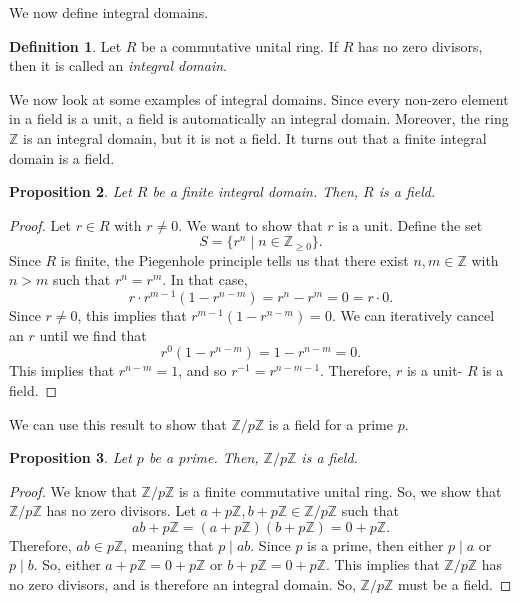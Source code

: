 \documentclass[a4paper, openany]{memoir}
\theoremstyle{definition}
\newtheorem{definition}{Definition}[section]
\theoremstyle{plain}
\newtheorem{proposition}[definition]{Proposition}
\begin{document}
We now define integral domains.
\begin{definition}
Let $R$ be a commutative unital ring. If $R$ has no zero divisors, then it is called an \emph{integral domain}.
\end{definition}
\noindent We now look at some examples of integral domains. Since every non-zero element in a field is a unit, a field is automatically an integral domain. Moreover, the ring $\mathbb{Z}$ is an integral domain, but it is not a field. It turns out that a finite integral domain is a field.
\begin{proposition}
Let $R$ be a finite integral domain. Then, $R$ is a field.
\end{proposition}
\begin{proof}
Let $r \in R$ with $r \neq 0$. We want to show that $r$ is a unit. Define the set
\[S = \{r^n \mid n \in \mathbb{Z}_{\geqslant 0}\}.\]
Since $R$ is finite, the Piegenhole principle tells us that there exist $n, m \in \mathbb{Z}$ with $n > m$ such that $r^n = r^m$. In that case,
\[r \cdot r^{m-1} (1 - r^{n-m}) = r^n - r^m = 0 = r \cdot 0.\]
Since $r \neq 0$, this implies that $r^{m-1}(1 - r^{n-m}) = 0$. We can iteratively cancel an $r$ until we find that 
\[r^0(1 - r^{n-m}) = 1 - r^{n-m} = 0.\]
This implies that $r^{n-m} = 1$, and so $r^{-1} = r^{n-m-1}$. Therefore, $r$ is a unit- $R$ is a field.
\end{proof}
\noindent We can use this result to show that $\mathbb{Z}/p \mathbb{Z}$ is a field for a prime $p$.
\begin{proposition}
Let $p$ be a prime. Then, $\mathbb{Z}/p \mathbb{Z}$ is a field.
\end{proposition}
\begin{proof}
We know that $\mathbb{Z}/p \mathbb{Z}$ is a finite commutative unital ring. So, we show that $\mathbb{Z}/p \mathbb{Z}$ has no zero divisors. Let $a + p \mathbb{Z}, b + p \mathbb{Z} \in \mathbb{Z}/p \mathbb{Z}$ such that 
\[ab + p \mathbb{Z} = (a + p \mathbb{Z})(b + p \mathbb{Z}) = 0 + p \mathbb{Z}.\]
Therefore, $ab \in p\mathbb{Z}$, meaning that $p \mid ab$. Since $p$ is a prime, then either $p \mid a$ or $p \mid b$. So, either $a + p \mathbb{Z} = 0 + p \mathbb{Z}$ or $b + p \mathbb{Z} = 0 + p \mathbb{Z}$. This implies that $\mathbb{Z}/p \mathbb{Z}$ has no zero divisors, and is therefore an integral domain. So, $\mathbb{Z}/p \mathbb{Z}$ must be a field.
\end{proof}
\end{document}
